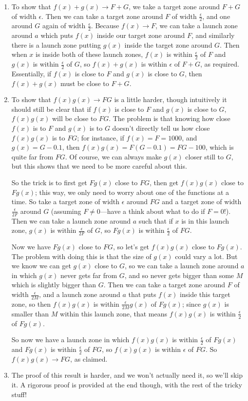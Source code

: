 \documentclass{article}
\begin{document}
\begin{enumerate}
	\item To show that $f(x)+g(x)\to F+G$, we take a target zone around $F+G$ of width $\epsilon$. Then we can take a target zone around $F$ of width $\frac{\epsilon}{2}$, and one around $G$ again of width $\frac{\epsilon}{2}$. Because $f(x)\to F$, we can take a launch zone around $a$ which puts $f(x)$ inside our target zone around $F$, and similarly there is a launch zone putting $g(x)$ inside the target zone around $G$. Then when $x$ is inside both of these launch zones, $f(x)$ is within $\frac{\epsilon}{2}$ of $F$ and $g(x)$ is within $\frac{\epsilon}{2}$ of $G$, so $f(x)+g(x)$ is within $\epsilon$ of $F+G$, as required. Essentially, if $f(x)$ is close to $F$ and $g(x)$ is close to $G$, then $f(x)+g(x)$ must be close to $F+G$.
	\item To show that $f(x)g(x)\to FG$ is a little harder, though intuitively it should still be clear that if $f(x)$ is close to $F$ and $g(x)$ is close to $G$, $f(x)g(x)$ will be close to $FG$. The problem is that knowing how close $f(x)$ is to $F$ and $g(x)$ is to $G$ doesn't directly tell us how close $f(x)g(x)$ is to $FG$; for instance, if $f(x)=F=1000$, and $g(x)=G-0.1$, then $f(x)g(x)=F(G-0.1)=FG-100$, which is quite far from $FG$. Of course, we can always make $g(x)$ closer still to $G$, but this shows that we need to be more careful about this.
	
	So the trick is to first get $Fg(x)$ close to $FG$, then get $f(x)g(x)$ close to $Fg(x)$; this way, we only need to worry about one of the functions at a time. So take a target zone of width $\epsilon$ around $FG$ and a target zone of width $\frac{\epsilon}{2F}$ around $G$ (assuming $F\neq 0$---have a think about what to do if $F=0$!). Then we can take a launch zone around $a$ such that if $x$ is in this launch zone, $g(x)$ is within $\frac{\epsilon}{2F}$ of $G$, so $Fg(x)$ is within $\frac{\epsilon}{2}$ of $FG$.
	
	Now we have $Fg(x)$ close to $FG$, so let's get $f(x)g(x)$ close to $Fg(x)$. The problem with doing this is that the size of $g(x)$ could vary a lot. But we know we can get $g(x)$ close to $G$, so we can take a launch zone around $a$ in which $g(x)$ never gets far from $G$, and so never gets bigger than some $M$ which is slightly bigger than $G$. Then we can take a target zone around $F$ of width $\frac{\epsilon}{2M}$, and a launch zone around $a$ that puts $f(x)$ inside this target zone, so then $f(x)g(x)$ is within $\frac{\epsilon}{2M}g(x)$ of $Fg(x)$; since $g(x)$ is smaller than $M$ within this launch zone, that means $f(x)g(x)$ is within $\frac{\epsilon}{2}$ of $Fg(x)$.
	
	So now we have a launch zone in which $f(x)g(x)$ is within $\frac{\epsilon}{2}$ of $Fg(x)$ and $Fg(x)$ is within $\frac{\epsilon}{2}$ of $FG$, so $f(x)g(x)$ is within $\epsilon$ of $FG$. So $f(x)g(x)\to FG$, as claimed.
	
	\item The proof of this result is harder, and we won't actually need it, so we'll skip it. A rigorous proof is provided at the end though, with the rest of the tricky stuff!
\end{enumerate}
\end{document}
